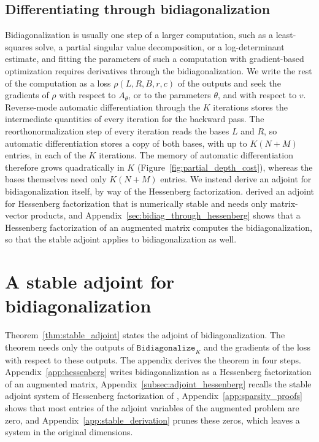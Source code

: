 \documentclass[a4paper,12pt]{article}
\theoremstyle{definition}
\begin{document}
\subsection{Differentiating through bidiagonalization}\label{subsec:differentiating}
Bidiagonalization is usually one step of a larger computation, such as a least-squares solve, a partial singular value decomposition, or a log-determinant estimate, and fitting the parameters of such a computation with gradient-based optimization requires derivatives through the bidiagonalization. We write the rest of the computation as a loss $\rho(L, R, B, r, c)$ of the outputs and seek the gradients of $\rho$ with respect to $A_\theta$, or to the parameters $\theta$, and with respect to $v$. Reverse-mode automatic differentiation through the $K$ iterations stores the intermediate quantities of every iteration for the backward pass. The reorthonormalization step of every iteration reads the bases $L$ and $R$, so automatic differentiation stores a copy of both bases, with up to $K(N + M)$ entries, in each of the $K$ iterations. The memory of automatic differentiation therefore grows quadratically in $K$ (Figure~\ref{fig:partial_depth_cost}), whereas the bases themselves need only $K(N + M)$ entries. We instead derive an adjoint for bidiagonalization itself, by way of the Hessenberg factorization. \citet{kraemer2024gradients} derived an adjoint for Hessenberg factorization that is numerically stable and needs only matrix-vector products, and Appendix~\ref{sec:bidiag_through_hessenberg} shows that a Hessenberg factorization of an augmented matrix computes the bidiagonalization, so that the stable adjoint applies to bidiagonalization as well.

\section{A stable adjoint for bidiagonalization}\label{sec:method}
Theorem~\ref{thm:stable_adjoint} states the adjoint of bidiagonalization. The theorem needs only the outputs of $\texttt{Bidiagonalize}_K$ and the gradients of the loss with respect to these outputs. The appendix derives the theorem in four steps. Appendix~\ref{app:hessenberg} writes bidiagonalization as a Hessenberg factorization of an augmented matrix, Appendix~\ref{subsec:adjoint_hessenberg} recalls the stable adjoint system of Hessenberg factorization of \citet{kraemer2024gradients}, Appendix~\ref{app:sparsity_proofs} shows that most entries of the adjoint variables of the augmented problem are zero, and Appendix~\ref{app:stable_derivation} prunes these zeros, which leaves a system in the original dimensions.
\end{document}
